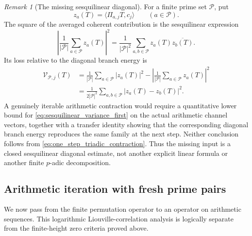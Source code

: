 \documentclass[11pt]{amsart}
\numberwithin{equation}{section}
\theoremstyle{plain}
\theoremstyle{definition}
\theoremstyle{remark}
\newtheorem{remark}[theorem]{Remark}
\begin{document}
\begin{remark}[The missing sesquilinear diagonal]
\label{rem:missing_sesquilinear_diagonal}
For a finite prime set $\mathcal P$, put
\begin{equation}
z_a(T)=\langle \Pi_{a,j}T,c_j\rangle
\qquad(a\in\mathcal P).
\label{eq:branch_amplitudes}
\end{equation}
The square of the averaged coherent contribution is the sesquilinear expression
\begin{equation}
\left|
\frac{1}{|\mathcal P|}\sum_{a\in\mathcal P}z_a(T)
\right|^2
=
\frac{1}{|\mathcal P|^2}
\sum_{a,b\in\mathcal P}z_a(T)\overline{z_b(T)}.
\label{eq:sesquilinear_branch_average}
\end{equation}
Its loss relative to the diagonal branch energy is
\begin{align}
\mathcal V_{\mathcal P,j}(T)
&=
\frac{1}{|\mathcal P|}\sum_{a\in\mathcal P}|z_a(T)|^2
-
\left|
\frac{1}{|\mathcal P|}\sum_{a\in\mathcal P}z_a(T)
\right|^2
\label{eq:sesquilinear_variance_first}
\\
&=
\frac{1}{2|\mathcal P|^2}
\sum_{a,b\in\mathcal P}|z_a(T)-z_b(T)|^2.
\label{eq:sesquilinear_variance_second}
\end{align}
A genuinely iterable arithmetic contraction would require a quantitative lower bound for \eqref{eq:sesquilinear_variance_first} on the actual arithmetic channel vectors, together with a transfer identity showing that the corresponding diagonal branch energy reproduces the same family at the next step.  Neither conclusion follows from \eqref{eq:one_step_triadic_contraction}.  Thus the missing input is a closed sesquilinear diagonal estimate, not another explicit linear formula or another finite $p$-adic decomposition.
\end{remark}

\subsection{Arithmetic iteration with fresh prime pairs}
\label{subsec:fresh_prime_arithmetic_iteration}

We now pass from the finite permutation operator to an operator on arithmetic sequences.  This logarithmic Liouville-correlation analysis is logically separate from the finite-height zero criteria proved above.
\end{document}
